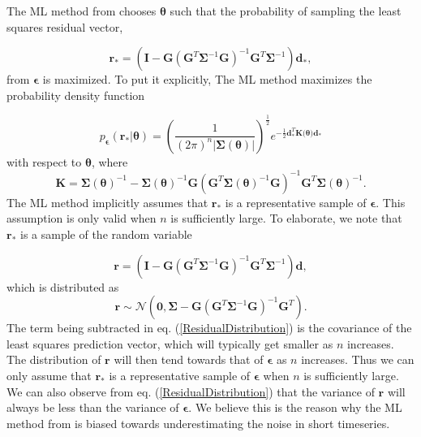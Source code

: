 \documentclass[10pt,a4paper]{article}
\begin{document}
The ML method from \citet{Langbein1997} chooses $\mathbf{\theta}$ such that the probability of sampling the least squares residual vector,

\begin{equation}\label{ResidualRealization}
  \mathbf{r}_* =  \left(\mathbf{I} - \mathbf{G}\left(\mathbf{G}^T\mathbf{\Sigma}^{-1}\mathbf{G}\right)^{-1}\mathbf{G}^T\mathbf{\Sigma}^{-1}\right)\mathbf{d_*},
\end{equation}  
from $\mathbf{\epsilon}$ is maximized. To put it explicitly, The ML method maximizes the probability density function

\begin{equation}\label{MLProb}
p_\mathbf{\epsilon}(\mathbf{r}_*|\mathbf{\theta}) = 
\left(\frac{1}{(2\pi)^n\left| \mathbf{\Sigma}(\mathbf{\theta}) \right|}\right)^{\frac{1}{2}} 
e^{-\tfrac{1}{2}\mathbf{d}_*^T\mathbf{K(\mathbf{\theta}})\mathbf{d}_*}
\end{equation}
with respect to $\mathbf{\theta}$, where
\begin{equation}
\mathbf{K} = \mathbf{\Sigma}(\mathbf{\theta})^{-1} - 
             \mathbf{\Sigma}(\mathbf{\theta})^{-1}\mathbf{G}
             \left(\mathbf{G}^T\mathbf{\Sigma}(\mathbf{\theta})^{-1}\mathbf{G}\right)^{-1}
             \mathbf{G}^T\mathbf{\Sigma}(\mathbf{\theta})^{-1}.
\end{equation}
The ML method implicitly assumes that $\mathbf{r}_*$ is a representative sample of $\mathbf{\epsilon}$. This assumption is only valid when $n$ is sufficiently large. To elaborate, we note that $\mathbf{r_*}$ is a sample of the random variable

\begin{equation}\label{ResidualVariable}
  \mathbf{r} =  \left(\mathbf{I} - \mathbf{G}\left(\mathbf{G}^T\mathbf{\Sigma}^{-1}\mathbf{G}\right)^{-1}\mathbf{G}^T\mathbf{\Sigma}^{-1}\right)\mathbf{d},
\end{equation}  
which is distributed as
\begin{equation}\label{ResidualDistribution}
  \mathbf{r} \sim \mathcal{N}\left(\mathbf{0},\mathbf{\Sigma} - \mathbf{G}\left(\mathbf{G}^T\mathbf{\Sigma}^{-1}\mathbf{G}\right)^{-1}\mathbf{G}^T\right).
\end{equation}
The term being subtracted in eq. (\ref{ResidualDistribution}) is the covariance of the least squares prediction vector, which will typically get smaller as $n$ increases. The distribution of $\mathbf{r}$ will then tend towards that of $\mathbf{\epsilon}$ as $n$ increases. Thus we can only assume that $\mathbf{r}_*$ is a representative sample of $\mathbf{\epsilon}$ when $n$ is sufficiently large. We can also observe from eq. (\ref{ResidualDistribution}) that the variance of $\mathbf{r}$ will always be less than the variance of $\mathbf{\epsilon}$.  We believe this is the reason why the ML method from \citet{Langbein1997} is biased towards underestimating the noise in short timeseries.
\end{document}
